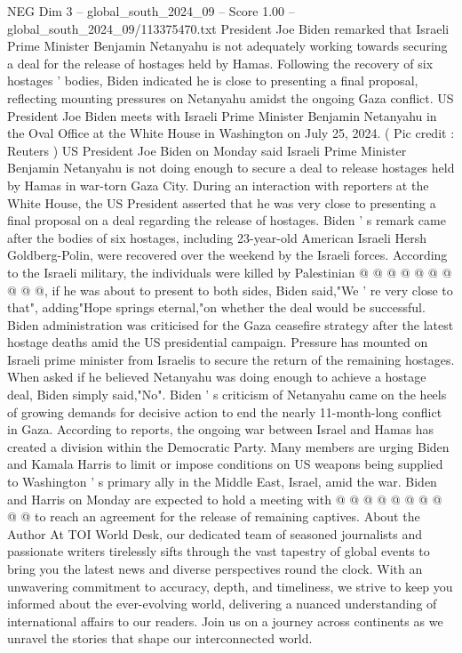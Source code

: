 \begin{textsample}{NEG Dim 3 – global\_south\_2024\_09 – Score 1.00 – global\_south\_2024\_09/113375470.txt}  \label{ex:f3_neg_134}
President Joe Biden remarked that Israeli Prime Minister Benjamin Netanyahu is not adequately working towards securing a deal for the release of hostages held by Hamas.
Following the recovery of six hostages ' bodies, Biden indicated he is close to presenting a final proposal, reflecting mounting pressures on Netanyahu amidst the ongoing Gaza conflict.
US President Joe Biden meets with Israeli Prime Minister Benjamin Netanyahu in the Oval Office at the White House in Washington on July 25, 2024. ( Pic credit : Reuters ) US President Joe Biden on Monday said Israeli Prime Minister Benjamin Netanyahu is not doing enough to secure a deal to release hostages held by Hamas in war-torn Gaza City.
During an interaction with reporters at the White House, the US President asserted that he was very close to presenting a final proposal on a deal regarding the release of hostages.
Biden ' s remark came after the bodies of six hostages, including 23-year-old American Israeli Hersh Goldberg-Polin, were recovered over the weekend by the Israeli forces.
According to the Israeli military, the individuals were killed by Palestinian @ @ @ @ @ @ @ @ @ @, if he was about to present to both sides, Biden said,"We ' re very close to that", adding"Hope springs eternal,"on whether the deal would be successful.
Biden administration was criticised for the Gaza ceasefire strategy after the latest hostage deaths amid the US presidential campaign.
Pressure has mounted on Israeli prime minister from Israelis to secure the return of the remaining hostages.
When asked if he believed Netanyahu was doing enough to achieve a hostage deal, Biden simply said,"No".
Biden ' s criticism of Netanyahu came on the heels of growing demands for decisive action to end the nearly 11-month-long conflict in Gaza.
According to reports, the ongoing war between Israel and Hamas has created a division within the Democratic Party.
Many members are urging Biden and Kamala Harris to limit or impose conditions on US weapons being supplied to Washington ' s primary ally in the Middle East, Israel, amid the war.
Biden and Harris on Monday are expected to hold a meeting with @ @ @ @ @ @ @ @ @ @ to reach an agreement for the release of remaining captives.
About the Author At TOI World Desk, our dedicated team of seasoned journalists and passionate writers tirelessly sifts through the vast tapestry of global events to bring you the latest news and diverse perspectives round the clock.
With an unwavering commitment to accuracy, depth, and timeliness, we strive to keep you informed about the ever-evolving world, delivering a nuanced understanding of international affairs to our readers.
Join us on a journey across continents as we unravel the stories that shape our interconnected world.

\end{textsample}
